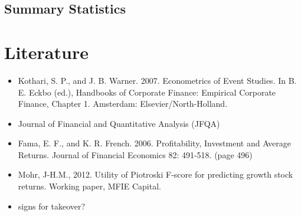 \documentclass[12pt]{article}
\begin{document}
    \subsection{Summary Statistics}

\section{Literature}

    \begin{itemize}
        \item Kothari, S. P., and J. B. Warner. 2007. Econometrics of Event Studies. In B. E. Eckbo (ed.), Handbooks of Corporate Finance: Empirical Corporate Finance, Chapter 1. Amsterdam: Elsevier/North-Holland.
        \item Journal of Financial and Quantitative Analysis (JFQA)
        \item Fama, E. F., and K. R. French. 2006. Profitability, Investment and Average Returns. Journal of Financial Economics 82: 491-518. (page 496)
        \item Mohr, J-H.M., 2012. Utility of Piotroski F-score for predicting growth stock returns. Working paper, MFIE Capital.
        \item signs for takeover? 
    \end{itemize}
\end{document}
